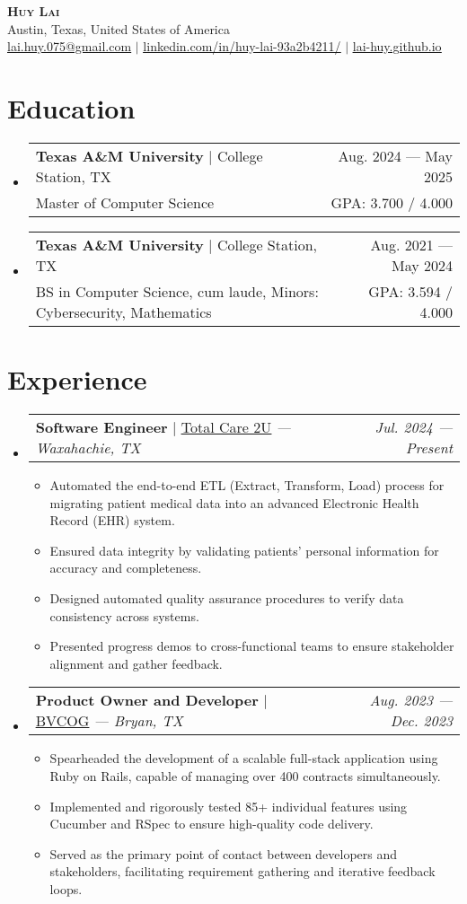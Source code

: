 \documentclass[letterpaper,12pt]{article}
\makeatletter
\newcommand{\resumeItem}[1]{
  \item\small{
    {#1 \vspace{-2pt}}
  }
}
\newcommand{\resumeDegreeheading}[5]{
  \vspace{-2pt}\item
    \begin{tabular*}{0.97\textwidth}[t]{l@{\extracolsep{\fill}}r}
      \textbf{#1} $|$ #2 & #3 \\
      \small#4 & GPA: \small #5 / 4.000 \\
    \end{tabular*}\vspace{-7pt}
}
\newcommand{\resumeSubheading}[4]{
  \vspace{-2pt}\item
    \begin{tabular*}{0.97\textwidth}[t]{l@{\extracolsep{\fill}}r}
      \textbf{#1} $|$ #2 \textit{--- #3} & \textit{#4} \\
    \end{tabular*}\vspace{-7pt}
}
\newcommand{\resumeSubHeadingListStart}{\begin{itemize}[leftmargin=0pt, label={}]}
\newcommand{\resumeSubHeadingListEnd}{\end{itemize}}
\newcommand{\resumeItemListStart}{\begin{itemize}[leftmargin=10pt]}
\newcommand{\resumeItemListEnd}{\end{itemize}\vspace{-10pt}}
\makeatother
\begin{document}
\begin{center}
    \textbf{\Huge \scshape Huy Lai} \\ \vspace{1pt}
    \small{Austin, Texas, United States of America} \\
    \small \href{mailto:lai.huy.075@gmail.com}{\underline{lai.huy.075@gmail.com}} $|$
    \href{https://www.linkedin.com/in/huy-lai-93a2b4211/}{\underline{linkedin.com/in/huy-lai-93a2b4211/}} $|$
    \href{https://lai-huy.github.io}{\underline{lai-huy.github.io}}
\end{center}


\vspace{-12pt}
\section{Education}
  \resumeSubHeadingListStart
    \resumeDegreeheading
      {Texas A\&M University}{College Station, TX}
      {Aug. 2024 --- May 2025}{Master of Computer Science}
      {3.700}
  
    \resumeDegreeheading
      {Texas A\&M University}{College Station, TX}
      {Aug. 2021 --- May 2024}{BS in Computer Science, cum laude, Minors: Cybersecurity, Mathematics}
      {3.594}
      
  \resumeSubHeadingListEnd

\vspace{-16pt}
\section{Experience}
  \resumeSubHeadingListStart
    \resumeSubheading
      {Software Engineer}{\href{https://www.totalcare2u.com/}{\underline{Total Care 2U}}}
      {Waxahachie, TX}{Jul. 2024 --- Present}
      \resumeItemListStart
        \resumeItem{Automated the end-to-end ETL (Extract, Transform, Load) process for migrating patient medical data into an advanced Electronic Health Record (EHR) system.}
        \resumeItem{Ensured data integrity by validating patients' personal information for accuracy and completeness.}
        \resumeItem{Designed automated quality assurance procedures to verify data consistency across systems.}
        \resumeItem{Presented progress demos to cross-functional teams to ensure stakeholder alignment and gather feedback.}
    \resumeItemListEnd

    \resumeSubheading
      {Product Owner and Developer}{\href{https://www.bvcog.org/}{\underline{BVCOG}}}
      {Bryan, TX}{Aug. 2023 --- Dec. 2023}
      \resumeItemListStart
        \resumeItem{Spearheaded the development of a scalable full-stack application using Ruby on Rails, capable of managing over 400 contracts simultaneously.}
        \resumeItem{Implemented and rigorously tested 85+ individual features using Cucumber and RSpec to ensure high-quality code delivery.}
        \resumeItem{Served as the primary point of contact between developers and stakeholders, facilitating requirement gathering and iterative feedback loops.}
      \resumeItemListEnd
  \resumeSubHeadingListEnd
\end{document}
